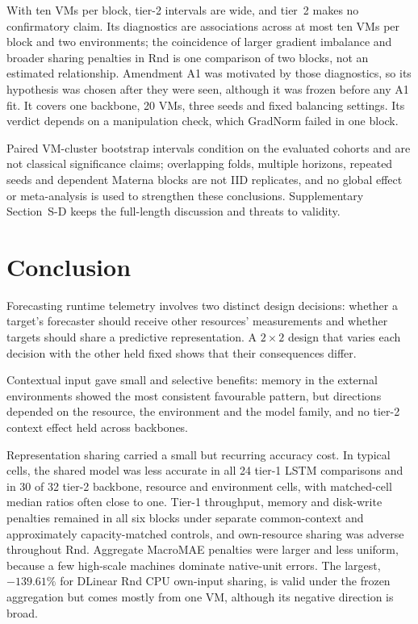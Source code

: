 \documentclass[5p,twocolumn]{elsarticle}
\begin{document}
With ten VMs per block, tier-2 intervals are wide, and tier~2 makes no
confirmatory claim. Its diagnostics are associations across at most ten VMs
per block and two environments; the coincidence of larger gradient
imbalance and broader sharing penalties in Rnd is one comparison of two
blocks, not an estimated relationship. Amendment A1 was motivated by those
diagnostics, so its hypothesis was chosen after they were seen, although it
was frozen before any A1 fit. It covers one backbone, 20 VMs, three seeds
and fixed balancing settings. Its verdict depends on a manipulation check,
which GradNorm failed in one block.

Paired VM-cluster bootstrap intervals condition on the evaluated cohorts and
are not classical significance claims; overlapping folds, multiple horizons,
repeated seeds and dependent Materna blocks are not IID replicates, and no
global effect or meta-analysis is used to strengthen these conclusions.
Supplementary Section~S-D keeps the full-length discussion and threats to
validity.

\section{Conclusion}
\label{sec:conclusion}

Forecasting runtime telemetry involves two distinct design decisions: whether
a target's forecaster should receive other resources' measurements and
whether targets should share a predictive representation. A $2\times2$
design that varies each decision with the other held fixed shows that their
consequences differ.

Contextual input gave small and selective benefits: memory in the external
environments showed the most consistent favourable pattern, but directions
depended on the resource, the environment and the model family, and no
tier-2 context effect held across backbones.

Representation sharing carried a small but recurring accuracy cost. In
typical cells, the shared model was less accurate in all 24 tier-1 LSTM
comparisons and in 30 of 32 tier-2 backbone, resource and environment cells,
with matched-cell median ratios often close to one. Tier-1 throughput, memory
and disk-write penalties remained in all six blocks under separate
common-context and approximately capacity-matched controls, and own-resource
sharing was adverse throughout Rnd. Aggregate MacroMAE penalties were larger
and less uniform, because a few high-scale machines dominate native-unit
errors. The largest, $-139.61\%$ for DLinear Rnd CPU own-input sharing, is
valid under the frozen aggregation but comes mostly from one VM, although its
negative direction is broad.
\end{document}
